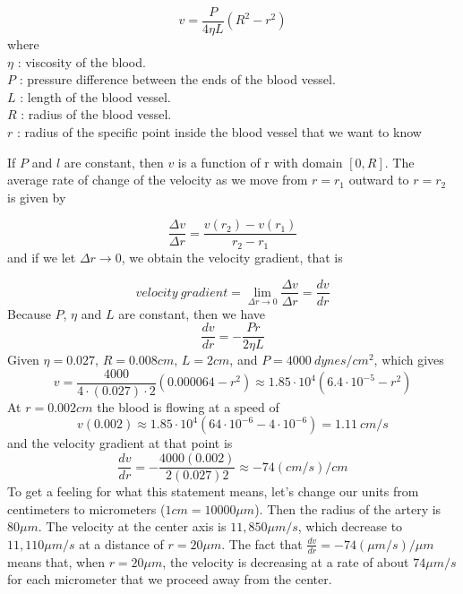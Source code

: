 \begin{equation}
	\label{eq:5}
	v = \frac{P}{4 \eta L}(R^2 - r^2)
\end{equation}
where\\
$\eta$ : viscosity of the blood.\\
$P$    : pressure difference between the ends of the blood vessel.\\
$L$    : length of the blood vessel.\\
$R$    : radius of the blood vessel.\\
$r$    : radius of the specific point inside the blood vessel that we want to know

\begin{flushleft}
If $P$ and $l$ are constant, then $v$ is a function of r with domain $[0, R]$. The average rate of change of the velocity as we move from $r=r_1$ outward to $r = r_2$ is given by
\end{flushleft}
$$
\frac{\Delta v}{\Delta r} = \frac{v(r_2) - v(r_1)}{r_2 - r_1}
$$
and if we let $\Delta r \rightarrow 0$, we obtain the velocity gradient, that is

\begin{equation}
	\label{eq:6}
	velocity\ gradient = \lim_{\Delta r \to 0} \frac{\Delta v}{\Delta r} = \frac{dv}{dr}
\end{equation}
Because $P$, $\eta$ and $L$ are constant, then we have
$$
	\frac{dv}{dr} = - \frac{Pr}{2 \eta L}
$$
Given $\eta=0.027$, $R=0.008cm$, $L=2cm$, and $P=4000 \ dynes/cm^2$, which gives
$$
    v = \frac{4000}{4\cdot(0.027)\cdot2} (0.000064 - r^2) \approx 1.85 \cdot 10^4(6.4 \cdot 10^{-5} - r^2)
$$
At $r=0.002cm$ the blood is flowing at a speed of
$$
    v(0.002) \approx 1.85 \cdot 10^4 (64 \cdot 10^{-6} - 4 \cdot 10^{-6}) = 1.11\ cm/s
$$
and the velocity gradient at that point is
$$
    \frac{dv}{dr}=-\frac{4000(0.002)}{2(0.027)2} \approx -74 (cm/s)/cm
$$
To get a feeling for what this statement means, let’s change our units from centimeters to micrometers ($1cm=10000 \mu m$). Then the radius of the artery is $80 \mu m$. The velocity at the center axis is $11,850 \mu m/s$, which decrease to $11,110 \mu m/s$ at a distance of $r=20 \mu m$. The fact that $\frac{dv}{dr}=-74(\mu m/s)/\mu m$ means that, when $r=20\mu m$, the velocity is decreasing at a rate of about $74\mu m/s$ for each micrometer that we proceed away from the center.

